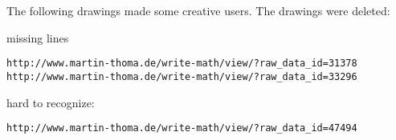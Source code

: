 The following drawings made some creative users. The drawings were deleted:


missing lines
\begin{verbatim}
http://www.martin-thoma.de/write-math/view/?raw_data_id=31378
http://www.martin-thoma.de/write-math/view/?raw_data_id=33296
\end{verbatim}

hard to recognize:
\begin{verbatim}
http://www.martin-thoma.de/write-math/view/?raw_data_id=47494
\end{verbatim}